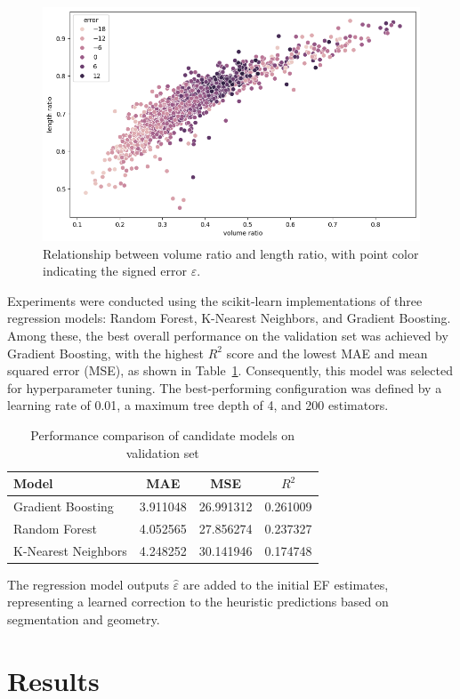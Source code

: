 \documentclass[runningheads]{llncs}
\begin{document}
\begin{figure}
    \centering
    \includegraphics[width=0.6\linewidth]{volume_vs_length.png}
    \caption{Relationship between volume ratio and length ratio, with point color indicating the signed error $\varepsilon$.}
    \label{fig:vr-lr}
\end{figure}

Experiments were conducted using the scikit-learn implementations \cite{pedregosa2011scikit} of three regression models: Random Forest, K-Nearest Neighbors, and Gradient Boosting. Among these, the best overall performance on the validation set was achieved by Gradient Boosting, with the highest $R^2$ score and the lowest MAE and mean squared error (MSE), as shown in Table~\ref{tab:model_performance}. Consequently, this model was selected for hyperparameter tuning. The best-performing configuration was defined by a learning rate of 0.01, a maximum tree depth of 4, and 200 estimators.

\begin{table}[ht]
\centering
\caption{Performance comparison of candidate models on validation set}
\label{tab:model_performance}
\begin{tabular}{|l|c|c|c|}
\hline
\textbf{Model}           & \textbf{MAE} & \textbf{MSE} & \textbf{$R^{2}$} \\
\hline
Gradient Boosting       & 3.911048     & 26.991312    & 0.261009 \\
Random Forest           & 4.052565     & 27.856274    & 0.237327 \\
K-Nearest Neighbors     & 4.248252     & 30.141946    & 0.174748 \\
\hline
\end{tabular}
\end{table}

The regression model outputs $\hat{\varepsilon}$ are added to the initial EF estimates, representing a learned correction to the heuristic predictions based on segmentation and geometry. 

\section{Results}
\end{document}
